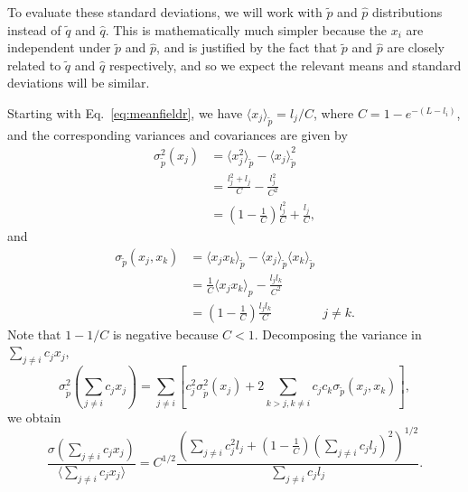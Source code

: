 \documentclass[12pt]{article}
\begin{document}
To evaluate these standard deviations, we will work with $\tilde{p}$ and $\hat{p}$ distributions instead of $\tilde{q}$ and $\hat{q}$. This is mathematically much simpler because the $x_i$ are independent under $\tilde{p}$ and $\hat{p}$, and is justified by the fact that $\tilde{p}$ and $\hat{p}$ are closely related to $\tilde{q}$ and $\hat{q}$ respectively, and so we expect the relevant means and standard deviations will be similar.

Starting with Eq.~\eqref{eq:meanfieldr}, we have $\langle x_j \rangle_{\tilde{p}}=l_j/C$, where $C=1-e^{-(L-l_i)}$, and the corresponding variances and covariances are given by
\begin{align}
\sigma_{\tilde{p}}^2(x_j)&=\langle x_j^2 \rangle_{\tilde{p}}-\langle x_j \rangle_{\tilde{p}}^2\nonumber\\
&=\frac{l_j^2 + l_j}{C}-\frac{l_j^2}{C^2}\nonumber \\
&=\left(1-\frac{1}{C}\right)\frac{l_j^2}{C}+\frac{l_j}{C},\label{eq:varr}
\end{align}
and
\begin{align}
\sigma_{\tilde{p}}(x_j,x_k)&=\langle x_j x_k \rangle_{\tilde{p}}-\langle x_j \rangle_{\tilde{p}}\langle x_k \rangle_{\tilde{p}}\nonumber\\
&=\frac{1}{C}\langle x_j x_k \rangle_p-\frac{l_jl_k}{C^2}\nonumber\\
&=\left(1-\frac{1}{C}\right)\frac{l_j l_k}{C}\qquad\qquad j\neq k. \label{eq:covr}
\end{align} 
Note that $1-1/C$ is negative because $C<1$. Decomposing the variance in $\sum_{j\neq i} c_j x_j$,
\begin{equation}
\sigma_{\tilde{p}}^2(\sum_{j\neq i} c_j x_j)=\sum_{j\neq i}\left[c_j^2\sigma_{\tilde{p}}^2(x_j)+2\sum_{k>j, k\neq i}c_j c_k\sigma_{\tilde{p}}(x_j,x_k)\right],\label{eq:vartotr}
\end{equation}
we obtain 
\begin{equation}
\frac{\sigma(\sum_{j\neq i} c_j x_j)}{\langle\sum_{j\neq i} c_j x_j\rangle}=C^{1/2}\frac{\left(\sum_{j\neq i}c_j^2 l_j+(1-\frac{1}{C})\left(\sum_{j\neq i}c_j l_j\right)^2 \right)^{1/2}}{\sum_{j\neq i}c_j l_j}. \label{eq:cvr}
\end{equation}
\end{document}
